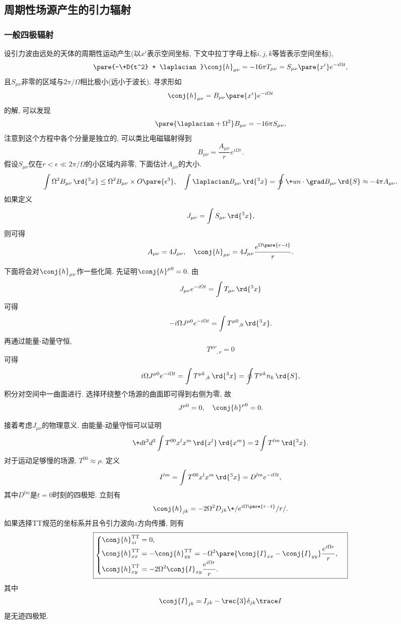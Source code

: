 \documentclass[hidelinks]{ctexart}
\begin{document}


\subsection{周期性场源产生的引力辐射} %
\label{sub:周期性场源产生的引力辐射}

\subsubsection{一般四极辐射} %
\label{ssub:一般四极辐射}

设引力波由远处的天体的周期性运动产生(以$x^i$表示空间坐标, 下文中拉丁字母上标$i,j,k$等皆表示空间坐标),
\[ \pare{-\+D{t^2} + \laplacian}\conj{h}_{\mu\nu} = -16\pi T_{\mu\nu} = S_{\mu\nu}\pare{x^i} e^{-i\Omega t}, \]
且$S_{\mu\nu}$非零的区域与$2\pi/\Omega$相比极小(远小于波长), 寻求形如
\[ \conj{h}_{\mu\nu} = B_{\mu\nu}\pare{x^i} e^{-i\Omega t} \]
的解, 可以发现
\[ \pare{\laplacian + \Omega^2} B_{\mu\nu} = -16\pi S_{\mu\nu}, \]
注意到这个方程中各个分量是独立的, 可以类比电磁辐射得到
\[ B_{\mu\nu} = \frac{A_{\mu\nu}}{r}e^{i\Omega r}. \]
假设$S_{\mu\nu}$仅在$r<\epsilon \ll 2\pi/\Omega$的小区域内非零, 下面估计$A_{\mu\nu}$的大小.
\[ \int \Omega^2 B_{\mu\nu}\,\rd{^3x} \le \Omega^2 B_{\mu\nu} \times O\pare{\epsilon^3}, \quad \int \laplacian B_{\mu\nu}\,\rd{^3x} = \oint \+un\cdot \grad B_{\mu\nu}\,\rd{S} \approx -4\pi A_{\mu\nu}. \]
如果定义
\[ J_{\mu\nu} = \int S_{\mu\nu}\,\rd{^3 x}, \]
则可得
\[ A_{\mu\nu} = 4J_{\mu\nu},\quad \conj{h}_{\mu\nu} = 4J_{\mu\nu} \frac{e^{\Omega\pare{r-t}}}{r}. \]
\par
下面将会对$\conj{h}_{\mu\nu}$作一些化简. 先证明$\conj{h}^{\mu 0} = 0$. 由
\[ J_{\mu\nu} e^{-i\Omega t} = \int T_{\mu\nu}\,\rd{^3 x} \]
可得
\[ -i\Omega J^{\mu 0} e^{-i\Omega t} = \int {T^{\mu 0}}_{,0}\,\rd{^3 x}. \]
再通过能量-动量守恒,
\[ {T^{\mu\nu}}_{,\nu} = 0 \]
可得
\[ i\Omega J^{\mu 0} e^{-i\Omega t} = \int {T^{\mu k}}_{,k}\,\rd{^3 x} = \oint T^{\mu k} n_{k}\,\rd{S}, \]
积分对空间中一曲面进行. 选择环绕整个场源的曲面即可得到右侧为零, 故
\[ J^{\mu 0} = 0,\quad \conj{h}^{\mu 0} = 0. \]
\par
接着考虑$J_{\mu\nu}$的物理意义. 由能量-动量守恒可以证明
\[ \+d{t^2}d{^2}\int T^{00}x^l x^m\,\rd{x^l}\,\rd{x^m} = 2 \int T^{lm}\,\rd{^3 x}. \]
对于运动足够慢的场源, $T^{00} \approx \rho$. 定义
\[ I^{lm} = \int T^{00} x^l x^m \,\rd{^3 x} = D^{lm} e^{-i\Omega t}, \]
其中$D^{lm}$是$t=0$时刻的四极矩. 立刻有
\[ \conj{h}_{jk} = -2\Omega^2 D_{jk} \+/e^{i\Omega\pare{r-t}}/r/. \]
如果选择TT规范的坐标系并且令引力波向$z$方向传播, 则有
\[ \boxed{\begin{cases}
    \displaystyle \conj{h}^{\mathrm{TT}}_{zi} = 0, \\
    \displaystyle \conj{h}^{\mathrm{TT}}_{xx} = -\conj{h}^{\mathrm{TT}}_{yy} = -\Omega^2\pare{\conj{I}_{xx} - \conj{I}_{yy}}\frac{e^{i\Omega r}}{r}, \\
    \displaystyle \conj{h}^{\mathrm{TT}}_{xy} = -2\Omega^2 \conj{I}_{xy} \frac{e^{i\Omega r}}{r}.
\end{cases}} \]
其中
\[ \conj{I}_{jk} = I_{jk} - \rec{3}\delta_{jk} \trace I \]
是无迹四极矩.
\end{document}
